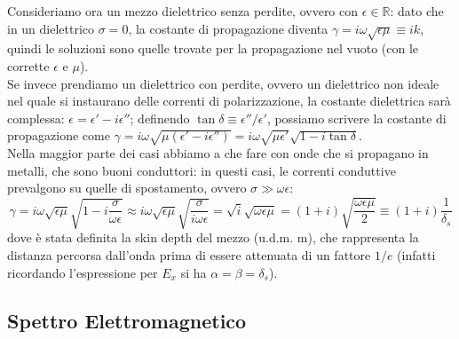 %
Consideriamo ora un mezzo dielettrico senza perdite, ovvero con $ \epsilon\in\mathbb{R} $: dato che in un dielettrico $ \sigma = 0 $, la costante di propagazione diventa $ \gamma = i \omega \sqrt{\epsilon\mu} \equiv i k $, quindi le soluzioni sono quelle trovate per la propagazione nel vuoto (con le corrette $ \epsilon $ e $ \mu $). \\ 
Se invece prendiamo un dielettrico con perdite, ovvero un dielettrico non ideale nel quale si instaurano delle correnti di polarizzazione, la costante dielettrica sarà complessa: $ \epsilon = \epsilon' - i \epsilon'' $; definendo $ \tan\delta \equiv \epsilon'' / \epsilon' $, possiamo scrivere la costante di propagazione come $ \gamma = i \omega \sqrt{\mu(\epsilon' - i \epsilon'')} = i \omega \sqrt{\mu \epsilon'} \sqrt{1 - i \tan\delta} $. \\ 
%
Nella maggior parte dei casi abbiamo a che fare con onde che si propagano in metalli, che sono buoni conduttori: in questi casi, le correnti conduttive prevalgono su quelle di spostamento, ovvero $ \sigma \gg \omega\epsilon $:
\begin{equation}
	\gamma = i \omega \sqrt{\epsilon\mu} \sqrt{1 - i \frac{\sigma}{\omega\epsilon}} \approx i \omega \sqrt{\epsilon\mu} \sqrt{\frac{\sigma}{i \omega \epsilon}} = \sqrt{i} \sqrt{\omega\epsilon\mu} = (1 + i) \sqrt{\frac{\omega\epsilon\mu}{2}} \equiv (1 + i) \frac{1}{\delta_s}
	\label{eq:23}
\end{equation}
dove è stata definita la skin depth del mezzo (u.d.m. $ \text{m} $), che rappresenta la distanza percorsa dall'onda prima di essere attenuata di un fattore $ 1/e $ (infatti ricordando l'espressione per $ E_x $ si ha $ \alpha = \beta = \delta_s $).

\subsection{Spettro Elettromagnetico}


